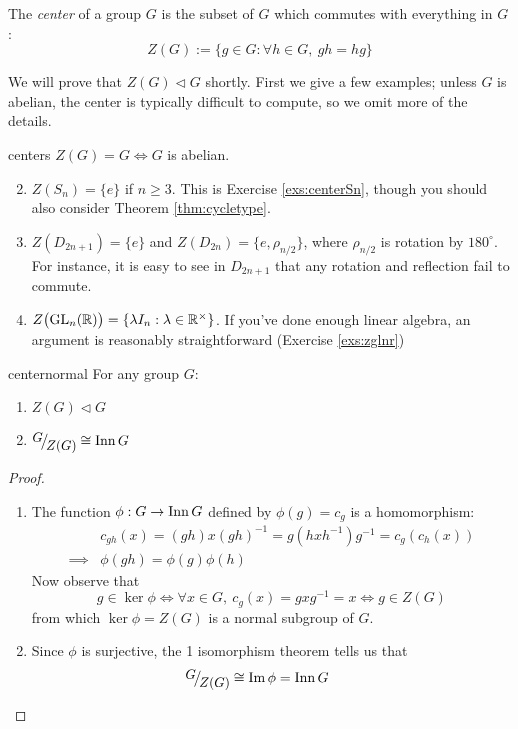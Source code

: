 \begin{defn}{}{}
	The \emph{center} of a group $G$ is the subset of $G$ which commutes with everything in $G$:
	\[
		Z(G):=\{g\in G:\forall h\in G,\ gh=hg\}
	\]
\end{defn}

We will prove that $Z(G)\triangleleft G$ shortly. First we give a few examples; unless $G$ is abelian, the center is typically difficult to compute, so we omit more of the details.


\begin{examples}{}{centers}
	\exstart $Z(G)=G\iff G$ is abelian.
	\begin{enumerate}\setcounter{enumi}{1}
	  \item $Z(S_n)=\{e\}$ if $n\ge 3$. This is Exercise \ref{exs:centerSn}, though you should also consider Theorem \ref{thm:cycletype}.
	  \item $Z(D_{2n+1})=\{e\}$ and $Z(D_{2n})=\{e,\rho_{n/2}\}$, where $\rho_{n/2}$ is rotation by $180^\circ$. For instance, it is easy to see in $D_{2n+1}$ that any rotation and reflection fail to commute.
	  \item $Z\bigl(\mathrm{GL}_n(\mathbb{R})\bigr)=\{\lambda I_n:\lambda\in\mathbb{R}^\times\}$. If you've done enough linear algebra, an argument is reasonably straightforward (Exercise \ref{exs:zglnr})
	\end{enumerate}
\end{examples}

\begin{thm}{}{centernormal}
	For any group $G$:
	\begin{enumerate}
	  \item $Z(G)\triangleleft G$
	  \item $\quotient G{Z(G)}\cong \Inn G$
	\end{enumerate}
\end{thm}

\begin{proof}
	\begin{enumerate}
	  \item The function $\phi:G\to\operatorname{Inn} G$ defined by $\phi(g)=c_g$ is a homomorphism:
		\begin{align*}
			&c_{gh}(x)=(gh)x(gh)^{-1}=g(hx h^{-1})g^{-1}=c_g(c_h(x))\\
			\implies &\phi(gh)=\phi(g)\phi(h)
		\end{align*}
		Now observe that
		\[
			g\in\ker\phi\iff \forall x\in G,\ c_g(x)=gx g^{-1}=x\iff g\in Z(G)
		\]
		from which $\ker\phi=Z(G)$ is a normal subgroup of $G$.
		\item Since $\phi$ is surjective, the 1\st{} isomorphism theorem tells us that
		\[
			\quotient{G}{Z(G)}\cong\image\phi=\Inn G
			\tag*{\qedhere}
		\]
	\end{enumerate}
\end{proof}

